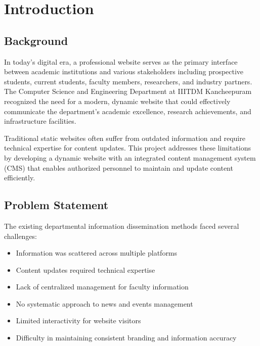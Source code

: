 \documentclass[12pt,a4paper]{report}
\begin{document}
\listoffigures
{}

\listoftables
{}

\chapter{Introduction}
\label{chap:introduction}

\section{Background}
In today's digital era, a professional website serves as the primary interface between academic institutions and various stakeholders including prospective students, current students, faculty members, researchers, and industry partners. The Computer Science and Engineering Department at IIITDM Kancheepuram recognized the need for a modern, dynamic website that could effectively communicate the department's academic excellence, research achievements, and infrastructure facilities.

Traditional static websites often suffer from outdated information and require technical expertise for content updates. This project addresses these limitations by developing a dynamic website with an integrated content management system (CMS) that enables authorized personnel to maintain and update content efficiently.

\section{Problem Statement}
The existing departmental information dissemination methods faced several challenges:
\begin{itemize}
    \item Information was scattered across multiple platforms
    \item Content updates required technical expertise
    \item Lack of centralized management for faculty information
    \item No systematic approach to news and events management
    \item Limited interactivity for website visitors
    \item Difficulty in maintaining consistent branding and information accuracy
\end{itemize}
\end{document}
